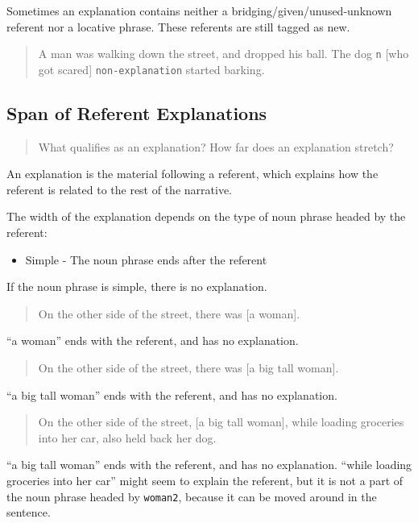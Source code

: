\documentclass[
]{book}
\providecommand{\tightlist}{%
  \setlength{\itemsep}{0pt}\setlength{\parskip}{0pt}}
\begin{document}
Sometimes an explanation contains neither
a bridging/given/unused-unknown referent nor a locative phrase.
These referents are still tagged as new.

\begin{quote}
A man was walking down the street, and dropped his ball.
The dog \texttt{n} {[}who got scared{]} \texttt{non-explanation} started barking.
\end{quote}

\hypertarget{span-of-referent-explanations}{%
\subsection{Span of Referent Explanations}\label{span-of-referent-explanations}}

\begin{quote}
What qualifies as an explanation?
How far does an explanation stretch?
\end{quote}

An explanation is the material following a referent,
which explains how the referent is related to the rest of the narrative.

The width of the explanation depends on the type of noun phrase headed by the referent:

\begin{itemize}
\tightlist
\item
  Simple - The noun phrase ends after the referent
\end{itemize}

If the noun phrase is simple, there is no explanation.

\begin{quote}
On the other side of the street,
there was {[}a woman{]}.
\end{quote}

``a woman'' ends with the referent, and has no explanation.

\begin{quote}
On the other side of the street,
there was {[}a big tall woman{]}.
\end{quote}

``a big tall woman'' ends with the referent, and has no explanation.

\begin{quote}
On the other side of the street,
{[}a big tall woman{]}, while loading groceries into her car,
also held back her dog.
\end{quote}

``a big tall woman'' ends with the referent, and has no explanation.
``while loading groceries into her car'' might seem to explain the referent,
but it is not a part of the noun phrase headed by \texttt{woman2},
because it can be moved around in the sentence.
\end{document}
